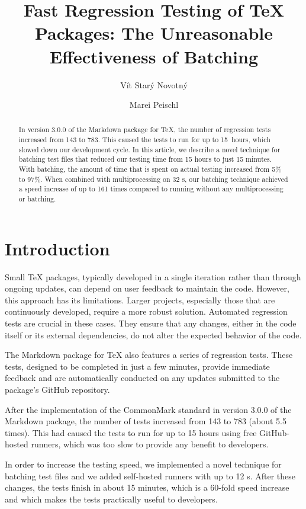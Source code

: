 \documentclass[final]{ltugboat}
\title{Fast Regression Testing of \TeX{} Packages: The Unreasonable Effectiveness of Batching}
\author{Vít Starý Novotný}
\author{Marei Peischl}
\begin{document}
\maketitle

\begin{abstract}
In version 3.0.0 of the Markdown package for \TeX, the number of regression tests increased from 143 to 783. This caused the tests to run for up to 15~hours, which slowed down our development cycle.
In this article, we describe a novel technique for batching test files that reduced our testing time from 15 hours to just 15 minutes. With batching, the amount of time that is spent on actual testing increased from 5\% to 97\%. When combined with multiprocessing on 32 s, our batching technique achieved a speed increase of up to 161 times compared to running without any multiprocessing or batching.
\end{abstract}

\section{Introduction}
Small \TeX{} packages, typically developed in a single iteration rather than through ongoing updates, can depend on user feedback to maintain the code. However, this approach has its limitations. Larger projects, especially those that are continuously developed, require a more robust solution. Automated regression tests are crucial in these cases. They ensure that any changes, either in the code itself or its external dependencies, do not alter the expected behavior of the code.

The Markdown package for \TeX{} also features a series of regression tests. These tests, designed to be completed in just a few minutes, provide immediate feedback and are automatically conducted on any updates submitted to the package's GitHub repository.

After the implementation of the CommonMark standard in version 3.0.0 of the Markdown package, the number of tests increased from 143 to 783 (about 5.5 times). This had caused the tests to run for up to 15 hours using free GitHub-hosted runners, which was too slow to provide any benefit to developers.

In order to increase the testing speed, we implemented a novel technique for batching test files and we added self-hosted runners with up to 12 s. After these changes, the tests finish in about 15 minutes, which is a 60-fold speed increase and which makes the tests practically useful to developers.
\end{document}

